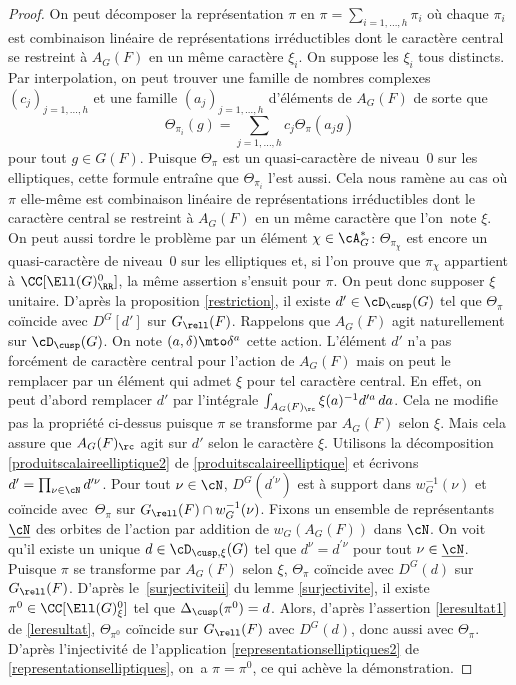 \begin{proof}
On peut décomposer la représentation $\pi$ en $\pi=\sum_{i=1,\dots,h}\pi_{i}$ où chaque $\pi_{i}$ est combinaison linéaire de représentations irréductibles dont le caractère central se restreint à $A_{G}(F)$ en un même caractère $\xi_{i}$. On suppose les $\xi_{i}$ tous distincts. Par interpolation, on peut trouver une famille de nombres complexes $(c_{j})_{j=1,\dots,h}$ et une famille $(a_{j})_{j=1,\dots,h}$ d'éléments de $A_{G}(F)$ de sorte que
\[
\Theta_{\pi_{i}}(g)=\sum_{j=1,\dots,h}c_{j}\Theta_{\pi}(a_{j}g)
\]
pour tout $g\in G(F)$. Puisque $\Theta_{\pi}$ est un quasi-caractère de niveau~$0$ sur les elliptiques, cette formule entraîne que $\Theta_{\pi_{i}}$ l'est aussi. Cela nous ramène au cas où $\pi$ elle-même est combinaison linéaire de représentations irréductibles dont le caractère central se restreint à $A_{G}(F)$ en un même caractère que l'on~note $\xi$. On peut aussi tordre le problème par un élément $\chi\in \cA_{G}^*$: $\Theta_{\pi_{\chi}}$ est encore un quasi-caractère de niveau~$0$ sur les elliptiques et, si l'on prouve que $\pi_{\chi}$ appartient à
$\CC[\Ell(G)^0_{\RR}]$, la même assertion s'ensuit pour $\pi$. On peut donc supposer $\xi$ unitaire. D'après la proposition \ref{restriction}, il existe $d'\in \cD_{\cusp}(G)$ tel que $\Theta_{\pi}$ coïncide avec $D^G[d']$ sur $G_{\rell}(F)$. Rappelons que $A_{G}(F)$ agit naturellement sur $\cD_{\cusp}(G)$. On note $(a,\delta)\mto \delta^{a}$ cette action.
L'élément $d'$ n'a pas forcément de caractère central pour l'action de $A_{G}(F)$ mais on peut le remplacer par un élément qui admet $\xi$ pour tel caractère central. En effet, on peut d'abord remplacer $d'$ par l'intégrale $\int_{A_{G}(F)_{\rc}}\xi(a)^{-1}d^{\prime a} \,da$. Cela ne modifie pas la propriété ci-dessus puisque $\pi$ se transforme par $A_{G}(F)$ selon $\xi$. Mais cela assure que $A_{G}(F)_{\rc}$ agit sur $d'$ selon le caractère $\xi$.
Utilisons la décomposition \eqref{produitscalaireelliptique2} de \ref{produitscalaireelliptique} et écrivons $d'=\prod_{\nu\in \cN}d^{\prime\nu}$. Pour tout $\nu\in \cN$, $D^G(d^{\prime\nu})$ est à support dans $w_{G}^{-1}(\nu)$ et coïncide avec~$\Theta_{\pi}$ sur $G_{\rell}(F)\cap w_{G}^{-1}(\nu)$.
Fixons un ensemble de représentants $\underline{\cN}$ des orbites de l'action par addition de $w_{G}(A_{G}(F))$ dans $\cN$. On voit qu'il existe un unique $ d\in \cD_{\cusp,\xi}(G)$ tel que $ d^{\nu}=d^{\prime\nu}$ pour tout $\nu\in \underline{\cN}$. Puisque $\pi$ se transforme par $A_{G}(F)$ selon $\xi$, $\Theta_{\pi}$ coïncide avec $D^G(d)$ sur $G_{\rell}(F)$. D'après le~\eqref{surjectiviteii} du lemme \ref{surjectivite}, il existe $\pi^0\in \CC[\Ell(G)_{\xi}^0]$ tel que $\Delta_{\cusp}(\pi^0)=d$. Alors, d'après l'assertion \eqref{leresultat1} de \ref{leresultat}, $\Theta_{\pi^0}$ coïncide sur $G_{\rell}(F)$ avec $D^G(d)$, donc aussi avec $\Theta_{\pi}$. D'après l'injectivité de l'application \eqref{representationselliptiques2} de \ref{representationselliptiques}, on~a $\pi=\pi^0$, ce qui achève la démonstration.
\end{proof}

